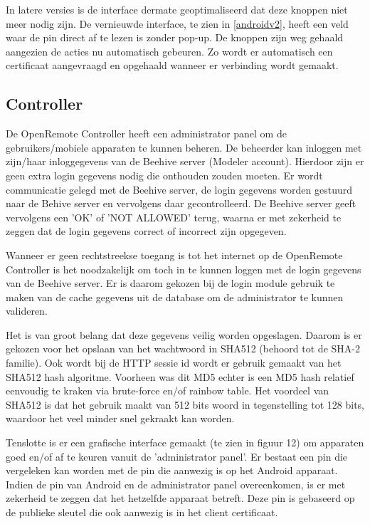 \documentclass[]{article}
\begin{document}
In latere versies is de interface dermate geoptimaliseerd dat deze knoppen niet
meer nodig zijn. De vernieuwde interface, te zien in \ref{androidv2}, heeft een
veld waar de pin direct af te lezen is zonder pop-up. De knoppen zijn weg
gehaald aangezien de acties nu automatisch gebeuren. Zo wordt er automatisch een
certificaat aangevraagd en opgehaald wanneer er verbinding wordt gemaakt. 

\subsection{Controller}
De OpenRemote Controller heeft een administrator panel om de gebruikers/mobiele
apparaten te kunnen beheren. De beheerder kan inloggen met zijn/haar
inloggegevens van de Beehive server (Modeler account). Hierdoor zijn er geen
extra login gegevens nodig die onthouden zouden moeten. Er wordt communicatie
gelegd met de Beehive server, de login gegevens worden gestuurd naar de Behive server
en vervolgens daar gecontrolleerd. De Beehive server geeft vervolgens een 'OK'
of 'NOT ALLOWED' terug, waarna er met zekerheid te zeggen dat de login gegevens
correct of incorrect zijn opgegeven.

Wanneer er geen rechtstreekse toegang is tot het internet op de 
OpenRemote Controller is het noodzakelijk om toch in te kunnen loggen met de
login gegevens van de Beehive server. Er is daarom gekozen bij de login module
gebruik te maken van de cache gegevens uit de database om de administrator te
kunnen valideren.

Het is van groot belang dat deze gegevens veilig worden opgeslagen. Daarom is er
gekozen voor het opslaan van het wachtwoord in SHA512 (behoord tot de SHA-2
familie). Ook wordt bij de HTTP sessie id  wordt er gebruik gemaakt van het SHA512
hash algoritme. Voorheen was dit MD5 echter is een MD5 hash relatief
eenvoudig te kraken via brute-force en/of rainbow table. Het voordeel van SHA512
is dat het gebruik maakt van 512 bits woord in tegenstelling tot 128
bits, waardoor het veel minder snel gekraakt kan worden.

Tenslotte is er een grafische interface gemaakt (te zien in figuur 12) om
apparaten goed en/of af te keuren vanuit de 'administrator panel'. Er bestaat
een pin die vergeleken kan worden met de pin die aanwezig is op het Android
apparaat. Indien de pin van Android en de administrator panel overeenkomen, is
er met zekerheid te zeggen dat het hetzelfde apparaat betreft. Deze pin is
gebaseerd op de publieke sleutel die ook aanwezig is in het client certificaat.
\end{document}
